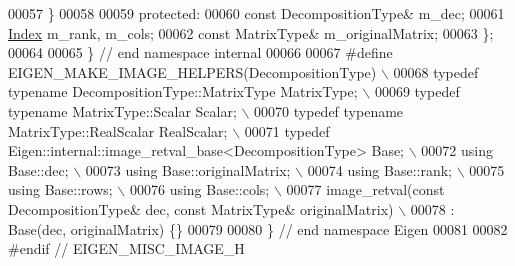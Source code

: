 \begin{DoxyCode}
00057   \}
00058 
00059   \textcolor{keyword}{protected}:
00060     \textcolor{keyword}{const} DecompositionType& m\_dec;
00061     \hyperlink{namespace_eigen_a62e77e0933482dafde8fe197d9a2cfde}{Index} m\_rank, m\_cols;
00062     \textcolor{keyword}{const} MatrixType& m\_originalMatrix;
00063 \};
00064 
00065 \} \textcolor{comment}{// end namespace internal}
00066 
00067 \textcolor{preprocessor}{#define EIGEN\_MAKE\_IMAGE\_HELPERS(DecompositionType) \(\backslash\)}
00068 \textcolor{preprocessor}{  typedef typename DecompositionType::MatrixType MatrixType; \(\backslash\)}
00069 \textcolor{preprocessor}{  typedef typename MatrixType::Scalar Scalar; \(\backslash\)}
00070 \textcolor{preprocessor}{  typedef typename MatrixType::RealScalar RealScalar; \(\backslash\)}
00071 \textcolor{preprocessor}{  typedef Eigen::internal::image\_retval\_base<DecompositionType> Base; \(\backslash\)}
00072 \textcolor{preprocessor}{  using Base::dec; \(\backslash\)}
00073 \textcolor{preprocessor}{  using Base::originalMatrix; \(\backslash\)}
00074 \textcolor{preprocessor}{  using Base::rank; \(\backslash\)}
00075 \textcolor{preprocessor}{  using Base::rows; \(\backslash\)}
00076 \textcolor{preprocessor}{  using Base::cols; \(\backslash\)}
00077 \textcolor{preprocessor}{  image\_retval(const DecompositionType& dec, const MatrixType& originalMatrix) \(\backslash\)}
00078 \textcolor{preprocessor}{    : Base(dec, originalMatrix) \{\}}
00079 
00080 \} \textcolor{comment}{// end namespace Eigen}
00081 
00082 \textcolor{preprocessor}{#endif // EIGEN\_MISC\_IMAGE\_H}
\end{DoxyCode}
